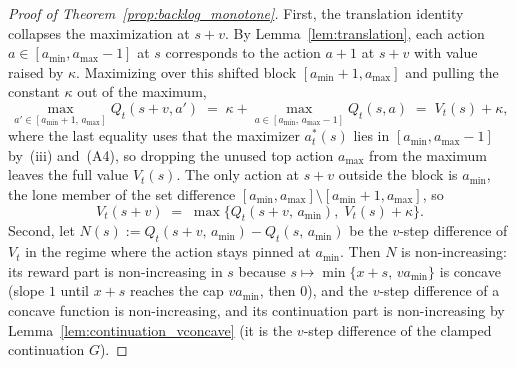 \documentclass[preprint,11pt,authoryear]{elsarticle}
\theoremstyle{remark}
\begin{document}
\begin{proof}[Proof of Theorem~\ref{prop:backlog_monotone}]
First, the translation identity collapses the maximization at $s+v$. By Lemma~\ref{lem:translation}, each action $a \in [a_{\min}, a_{\max}-1]$ at $s$ corresponds to the action $a+1$ at $s+v$ with value raised by $\kappa$. Maximizing over this shifted block $[a_{\min}+1, a_{\max}]$ and pulling the constant $\kappa$ out of the maximum,
\[
\max_{a' \in [a_{\min}+1,\, a_{\max}]} Q_t(s+v, a') \;=\; \kappa + \max_{a \in [a_{\min},\, a_{\max}-1]} Q_t(s, a) \;=\; V_t(s) + \kappa,
\]
where the last equality uses that the maximizer $a^*_t(s)$ lies in $[a_{\min}, a_{\max}-1]$ by~(iii) and~(A4), so dropping the unused top action $a_{\max}$ from the maximum leaves the full value $V_t(s)$. The only action at $s+v$ outside the block is $a_{\min}$, the lone member of the set difference $[a_{\min}, a_{\max}] \setminus [a_{\min}+1, a_{\max}]$, so
\begin{equation}
V_t(s+v) \;=\; \max\bigl\{Q_t(s+v,\, a_{\min}),\; V_t(s) + \kappa\bigr\}.
\label{eq:Vtsv_max}
\end{equation}
Second, let $N(s) := Q_t(s+v,\, a_{\min}) - Q_t(s,\, a_{\min})$ be the $v$-step difference of $V_t$ in the regime where the action stays pinned at $a_{\min}$. Then $N$ is non-increasing: its reward part is non-increasing in $s$ because $s \mapsto \min\{x+s,\, va_{\min}\}$ is concave (slope $1$ until $x+s$ reaches the cap $va_{\min}$, then $0$), and the $v$-step difference of a concave function is non-increasing, and its continuation part is non-increasing by Lemma~\ref{lem:continuation_vconcave} (it is the $v$-step difference of the clamped continuation $G$).


\end{proof}
\end{document}
